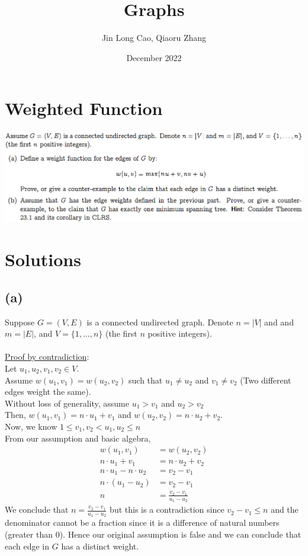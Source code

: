 \documentclass{article}
\title{Graphs}
\author{Jin Long Cao, Qiaoru Zhang}
\date{December 2022}
\begin{document}
\maketitle
\section*{Weighted Function}
\includegraphics[width=\textwidth]{Weighted Function}
\section*{Solutions}
\subsection*{(a)} 
Suppose $G = (V, E)$ is a connected undirected graph. Denote $n = |V|$ and and $m = |E|$, and $V = \{1,\dots, n\}$ (the first $n$ positive integers).\\~\\
\underline{Proof by contradiction}: \\
Let $u_1,u_2,v_1,v_2 \in V$.\\
Assume $w(u_1, v_1) = w(u_2,v_2)$ such that $u_1 \neq u_2$ and $v_1 \neq v_2$ (Two different edges weight the same).\\
Without loss of generality, assume $u_1>v_1$ and $u_2>v_2$\\
Then, $w(u_1, v_1) = n \cdot u_1 + v_1$ and $w(u_2, v_2) = n \cdot u_2 + v_2$.\\
Now, we know $1 \leq v_1, v_2 < u_1,u_2 \leq n$\\
From our assumption and basic algebra, 
\begin{align*}
    w(u_1, v_1) &= w(u_2,v_2)\\
    n \cdot u_1 + v_1 & = n \cdot u_2 + v_2\\
    n \cdot u_1 - n \cdot u_2 &= v_2 - v_1\\
    n \cdot (u_1 - u_2) &= v_2 - v_1\\
    n &= \frac{v_2 - v_1}{u_1 - u_2}
\end{align*}
We conclude that $n = \frac{v_2 - v_1}{u_1 - u_2}$ but this is a contradiction since $v_2 - v_1 \leq n$ and the denominator cannot be a fraction since it is a difference of natural numbers (greater than 0). Hence our original assumption is false and we can conclude that each edge in $G$ has a distinct weight.
\end{document}
